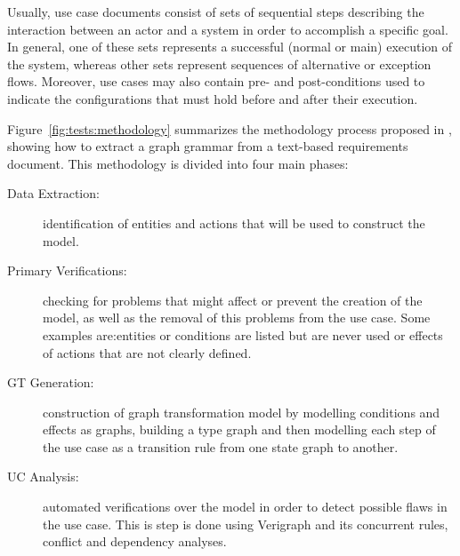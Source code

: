 Usually, use case documents consist of sets of sequential steps describing the interaction between an actor and a system in order to accomplish a specific goal. In general, one of these sets represents a successful (normal or main) execution of the system, whereas other sets represent sequences of alternative or exception flows. Moreover, use cases may also contain pre- and post-conditions used to indicate the configurations that must hold before and after their execution.

Figure~\ref{fig:tests:methodology} summarizes the methodology process proposed in \cite{Junior2015}, showing how to extract a graph grammar from a text-based requirements document. This methodology is divided into four main phases:


\begin{description}
  \item[Data Extraction:] identification of entities and actions that will be used to construct the model.

  \item[Primary Verifications:] checking for problems that might affect or prevent the creation of the model, as well as the removal of this problems from the use case. Some examples are:entities or conditions are listed but are never used or effects of actions that are not clearly defined.

  \item[GT Generation:] construction of graph transformation model by modelling conditions and effects as graphs, building a type graph and then modelling each step of the use case as a transition rule from one state graph to another.

  \item[UC Analysis:] automated verifications over the model in order to detect possible flaws in the use case. This is step is done using Verigraph and its concurrent rules, conflict and dependency analyses.
\end{description}

